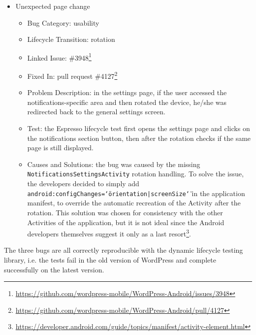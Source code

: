 \documentclass[11pt,a4paper,notitlepage]{article}
\begin{document}
\begin{itemize}
\begin{itemize}
		\item Linked Issue: \#3575\footnote{\url{https://github.com/wordpress-mobile/WordPress-Android/issues/3575}}
		\item Fixed In: pull request \#3577\footnote{\url{https://github.com/wordpress-mobile/WordPress-Android/pull/3577}}
		\item Problem Description: reading a long blog post, pausing and resuming the application caused most of the content to be invisible to the user.
		\item Test: the Espresso lifecycle test opens a blog post, scrolls down and, after the pause, checks that all the content is displayed.
		\item Causes and Solutions: the \texttt{WebView} component used to display the page was paused during \texttt{onPause()} but not resumed during \texttt{onResume()}, and so the simple solution of the bug was to add the latter call.
	\end{itemize}
	\item Unexpected page change
	\begin{itemize}
		\item Bug Category: usability
		\item Lifecycle Transition: rotation
		\item Linked Issue: \#3948\footnote{\url{https://github.com/wordpress-mobile/WordPress-Android/issues/3948}}
		\item Fixed In: pull request \#4127\footnote{\url{https://github.com/wordpress-mobile/WordPress-Android/pull/4127}}
		\item Problem Description: in the settings page, if the user accessed the notifications-specific area and then rotated the device, he/she was redirected back to the general settings screen. 
		\item Test: the Espresso lifecycle test first opens the settings page and clicks on the notifications section button, then after the rotation checks if the same page is still displayed.
		\item Causes and Solutions: the bug was caused by the missing \texttt{NotificationsSettingsActivity} rotation handling. To solve the issue, the developers decided to simply add \texttt{android:configChanges=\char`\"orientation|screenSize\char`\"} in the application manifest, to override the automatic recreation of the Activity after the rotation. This solution was chosen for consistency with the other Activities of the application, but it is not ideal since the Android developers themselves suggest it only as a last resort\footnote{\url{https://developer.android.com/guide/topics/manifest/activity-element.html}}.
	\end{itemize}
\end{itemize}
The three bugs are all correctly reproducible with the dynamic lifecycle testing library, i.e. the tests fail in the old version of WordPress and complete successfully on the latest version.
\end{document}

